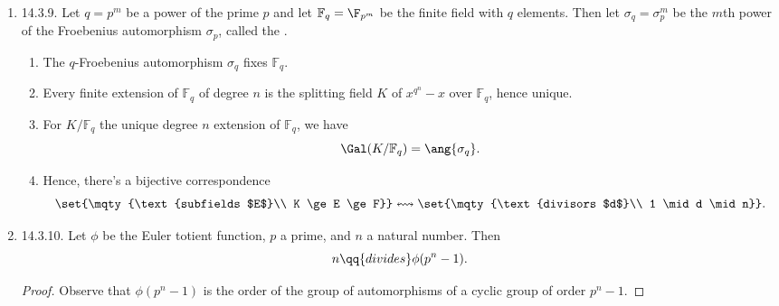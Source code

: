 \documentclass[onesided]{ccg-pset}
\newcommand{\Fq}{\mathbb{F}_q} %
\begin{document}
\begin{enumerate}
\item \label{14.3.9} 14.3.9.
Let $q = p^m$ be a power of the prime $p$ and let $\Fq = \F_{p^m}$ be the finite field with $q$ elements. Then let $\sigma_q = \sigma_p^m$ be the $m$th power of the Froebenius automorphism $\sigma_p$, called the .

\begin{enumerate}
    \item The $q$-Froebenius automorphism $\sigma_q$ fixes $\Fq$.
    \item Every finite extension of $\Fq$ of degree $n$ is the splitting field $K$ of $x^{q^n} -x$ over $\Fq$, hence unique.
    \item For $K/\Fq$ the unique degree $n$ extension of $\Fq$, we have 
    \[
        \Gal(K/\Fq) = \ang{\sigma_q}
    .\]
    \item Hence, there's a bijective correspondence
    \[
        \set{\mqty{\text{subfields $E$}\\
                    K \ge E \ge F}} 
            \leftrightsquigarrow 
        \set{\mqty{\text{divisors $d$}\\
                   1 \mid d \mid n}}
    .\]
\end{enumerate}
 
\item \label{14.3.10} 14.3.10.
Let $\phi$ be the Euler totient function, $p$ a prime, and $n$ a natural number. Then
\[
    n \qq{divides} \phi(p^n -1)
.\]
\begin{proof}
    Observe that $\phi(p^n -1)$ is the order of the group of automorphisms of a cyclic group of order $p^n -1$.
\end{proof}

\end{enumerate}
\end{document}
